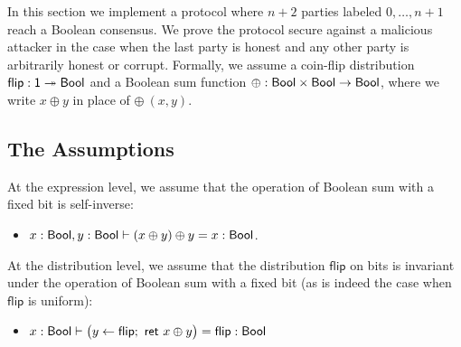 \renewcommand{\flip}{\mathsf{flip}}
\renewcommand{\id}{\mathsf{id}}
\renewcommand{\adv}{\mathsf{adv}}
\newcommand{\party}{\mathsf{party}}
\newcommand{\comm}{\mathsf{comm}}
\renewcommand{\Flip}{\mathsf{Flip}}
\newcommand{\Commit}{\mathsf{Commit}}
\newcommand{\Committed}{\mathsf{Committed}}
\newcommand{\Open}{\mathsf{Open}}
\newcommand{\Opened}{\mathsf{Opened}}
\newcommand{\SumCommit}{\mathsf{SumCommit}}
\newcommand{\AllCommitted}{\mathsf{AllCommitted}}
\newcommand{\AllOpen}{\mathsf{AllOpen}}
\newcommand{\SumOpened}{\mathsf{SumOpened}}
\renewcommand{\Out}{\mathsf{Out}}
\newcommand{\LastCommit}{\mathsf{LastCommit}}
\renewcommand{\LeakFlip}{\mathsf{LeakFlip}}
\newcommand{\Ok}{\mathsf{Ok}}
\newcommand{\AdvCommit}{\mathsf{AdvCommit}}
\newcommand{\LeakCommitted}{\mathsf{LeakCommitted}}
\newcommand{\AdvOpen}{\mathsf{AdvOpen}}
\newcommand{\LeakOpened}{\mathsf{LeakOpened}}

In this section we implement a protocol where $n+2$ parties labeled $0,\ldots,n+1$ reach a Boolean consensus. We prove the protocol secure against a malicious attacker in the case when the last party is honest and any other party is arbitrarily honest or corrupt. Formally, we assume a coin-flip distribution $\flip : \one \twoheadrightarrow \Bool$ and a Boolean sum function $\oplus : \mathsf{Bool} \times \mathsf{Bool} \rightarrow \mathsf{Bool}$, where we write $x \oplus y$ in place of $\oplus \ (x,y)$.

\subsection{The Assumptions}
At the expression level, we assume that the operation of Boolean sum with a fixed bit is self-inverse:
\begin{itemize}
\item $x : \mathsf{Bool}, y : \mathsf{Bool} \vdash (x \oplus y) \oplus y = x : \mathsf{Bool}$.
\end{itemize}
At the distribution level, we assume that the distribution $\flip$ on bits is invariant under the operation of Boolean sum with a fixed bit (as is indeed the case when $\flip$ is uniform):
\begin{itemize}
\item $x : \Bool \vdash \big(y \leftarrow \flip; \ \ret{x \oplus y}\big) = \flip : \Bool$
\end{itemize}

